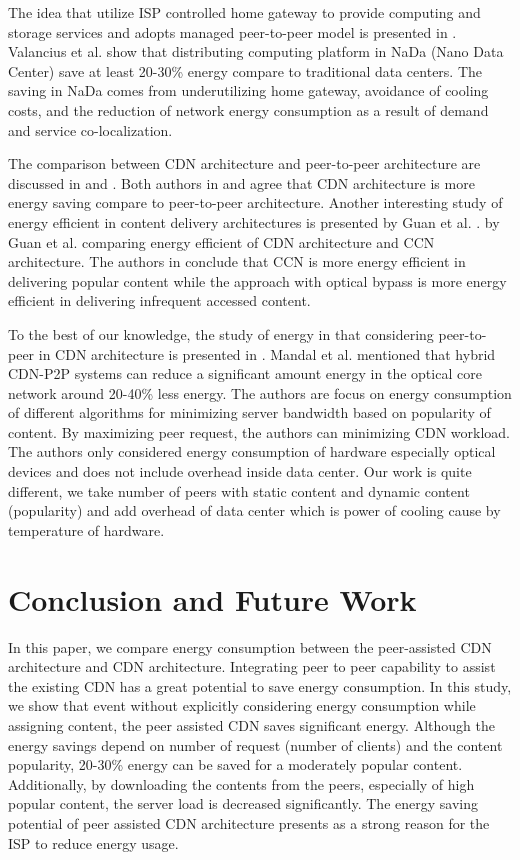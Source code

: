 \documentclass[JIP]{ipsj}
\begin{document}
The idea that utilize ISP controlled home gateway to provide computing and storage services and adopts managed peer-to-peer model is presented in \cite{valancius2009greening}. 
Valancius et al. \cite{valancius2009greening} show that distributing computing platform in NaDa (Nano Data Center) save at least 20-30\% energy compare to traditional data centers.
The saving in NaDa comes from underutilizing home gateway, avoidance of cooling costs, and the reduction of network energy consumption as a result of demand and service co-localization.

The comparison between CDN architecture and peer-to-peer architecture are discussed in \cite{baliga2007energy} and \cite{feldmann2010energy}.
Both authors in \cite{baliga2007energy} and \cite{feldmann2010energy} agree that CDN architecture is more energy saving compare to peer-to-peer architecture. 
Another interesting study of energy efficient in content delivery architectures is presented by Guan et al. \cite{5963557}.
by Guan et al. \cite{5963557} comparing energy efficient of CDN architecture and CCN architecture.
The authors in \cite{5963557} conclude that CCN is more energy efficient in delivering popular content while the approach with optical bypass is more energy efficient in delivering infrequent accessed content.

To the best of our knowledge, the study of energy in that considering peer-to-peer in CDN architecture is presented in \cite{6524219}.
Mandal et al. \cite{6524219} mentioned that hybrid CDN-P2P systems can reduce a significant amount energy in the optical core network around 20-40\% less energy.  
The authors are focus on energy consumption of different algorithms for minimizing server bandwidth based on popularity of content.  
By maximizing peer request, the authors can minimizing CDN workload. 
The authors only considered energy consumption of hardware especially optical devices and does not include overhead inside data center.  
Our work is quite different, we take number of peers with static content and dynamic content (popularity) and add overhead of data center which is  power of cooling cause by temperature of hardware.

 


\section{Conclusion and Future Work}\label{conclusion}

In this paper, we compare energy consumption between the peer-assisted CDN architecture and CDN architecture. 
Integrating peer to peer capability to assist the existing CDN has a great potential to save energy consumption.
In this study, we show that event without explicitly considering energy consumption while assigning content, the peer assisted CDN saves significant energy.
Although the energy savings depend on number of request (number of clients) and the content popularity, 20-30\% energy can be saved for a moderately popular content.
Additionally, by downloading the contents from the peers, especially of high popular content, the server load is decreased significantly.
The energy saving potential of peer assisted CDN architecture presents as a strong reason for the ISP to reduce energy usage.  
\end{document}
